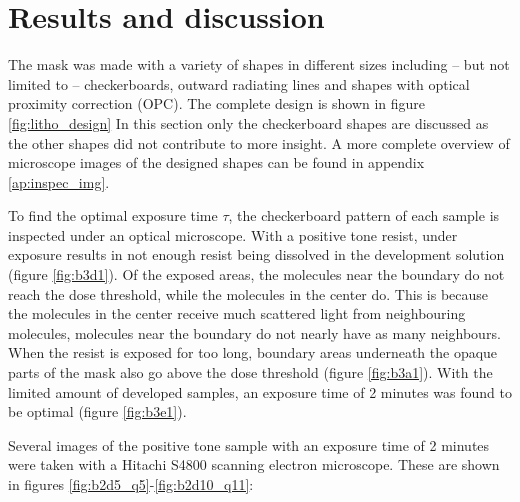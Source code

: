 \section*{Results and discussion}
The mask was made with a variety of shapes in different sizes including -- but not limited to -- checkerboards, outward radiating lines and shapes with optical proximity correction (OPC). The complete design is shown in figure \ref{fig:litho_design} In this section only the checkerboard shapes are discussed as the other shapes did not contribute to more insight. A more complete overview of microscope images of the designed shapes can be found in appendix \ref{ap:inspec_img}.

To find the optimal exposure time $\tau$, the checkerboard pattern of each sample is inspected under an optical microscope. With a positive tone resist, under exposure results in not enough resist being dissolved in the development solution (figure \ref{fig:b3d1}). Of the exposed areas, the molecules near the boundary do not reach the dose threshold, while the molecules in the center do. This is because the molecules in the center receive much scattered light from neighbouring molecules, molecules near the boundary do not nearly have as many neighbours. When the resist is exposed for too long, boundary areas underneath the opaque parts of the mask also go above the dose threshold (figure \ref{fig:b3a1}). With the limited amount of developed samples, an exposure time of 2 minutes was found to be optimal (figure \ref{fig:b3e1}). 

Several images of the positive tone sample with an exposure time of 2 minutes were taken with a Hitachi S4800 scanning electron microscope. These are shown in figures \ref{fig:b2d5_q5}-\ref{fig:b2d10_q11}:

